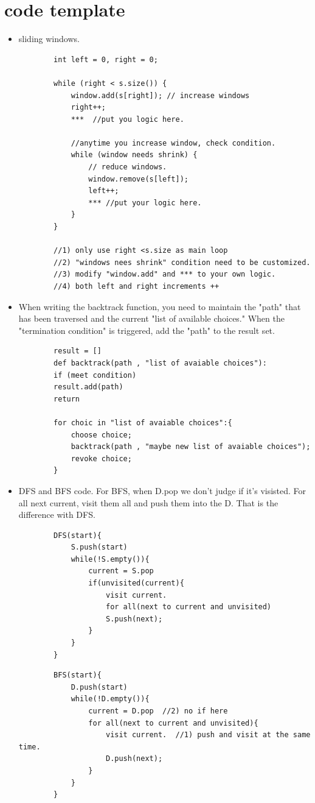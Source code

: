 \documentclass[a4paper,11pt,twoside]{book}
\begin{document}
\section{code template}
\begin{itemize}
	\item sliding windows. 
	
	\begin{lstlisting}
		int left = 0, right = 0;
		
		while (right < s.size()) {
			window.add(s[right]); // increase windows
			right++;
			***  //put you logic here.
			
			//anytime you increase window, check condition. 
			while (window needs shrink) {
				// reduce windows.
				window.remove(s[left]);
				left++;
				*** //put your logic here. 
			}
		}
		
		//1) only use right <s.size as main loop
		//2) "windows nees shrink" condition need to be customized. 
		//3) modify "window.add" and *** to your own logic. 
		//4) both left and right increments ++
	\end{lstlisting}
	
	\item When writing the backtrack function, you need to maintain the "path" that has been traversed and the current "list of available choices." When the "termination condition" is triggered, add the "path" to the result set.
	
	\begin{lstlisting}
		result = []
		def backtrack(path , "list of avaiable choices"):
		if (meet condition)
		result.add(path)
		return
		
		for choic in "list of avaiable choices":{
			choose choice;
			backtrack(path , "maybe new list of avaiable choices");
			revoke choice;
		}	
	\end{lstlisting}
	
	\item DFS and BFS code. For BFS, when D.pop we don't judge if it's visisted.  For all next current, visit them all and push them into the D. That is the difference with DFS.
	\begin{lstlisting}
		DFS(start){
			S.push(start)  
			while(!S.empty()){
				current = S.pop
				if(unvisited(current){
					visit current.
					for all(next to current and unvisited)
					S.push(next);
				}
			}
		}	
	\end{lstlisting}
	
	\begin{lstlisting} 
		BFS(start){
			D.push(start)  
			while(!D.empty()){
				current = D.pop  //2) no if here
				for all(next to current and unvisited){
					visit current.  //1) push and visit at the same time. 
					D.push(next);
				}
			}
		}
	\end{lstlisting}
	
\end{itemize}
\end{document}

